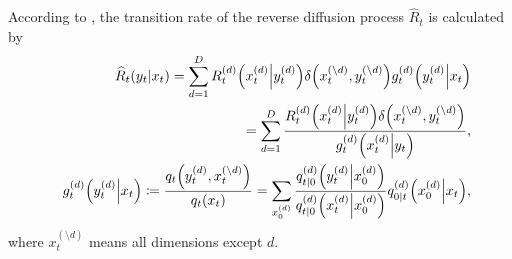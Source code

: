 \documentclass{article}
\begin{document}
According to \cite{zhao2024unified}, the transition rate of the reverse diffusion process $\widehat{R}_t$ is calculated by
\begin{eqnarray}\label{EqDivParaHatR}
    &&\widehat{R}_t\qty(y_t\middle|x_t)=\sum_{d=1}^D R^{(d)}_t\qty(x^{(d)}_t\middle| y^{(d)}_t)\delta\qty(x^{(\setminus d)}_t,y^{(\setminus d)}_t) g^{(d)}_t\qty(y^{(d)}_t\middle|x_t)\nonumber\\
    &&=\sum_{d=1}^D \frac{R^{(d)}_t\qty(x^{(d)}_t\middle| y^{(d)}_t)\delta\qty(x^{(\setminus d)}_t,y^{(\setminus d)}_t)}{g^{(d)}_t\qty(x^{(d)}_t\middle|y_t)},\\
    &&g^{(d)}_t\qty(y^{(d)}_t\middle|x_t)\coloneq \frac{q_t\qty(y^{(d)}_t, x^{(\setminus d)}_t)}{q_t\qty(x_t)} = \sum_{x^{(d)}_0}\frac{q^{(d)}_{t|0}\qty(y^{(d)}_t\middle|x^{(d)}_0)}{q^{(d)}_{t|0}\qty(x^{(d)}_t\middle|x^{(d)}_0)}q^{(d)}_{0|t}\qty(x^{(d)}_0\middle| x_t),
\end{eqnarray}
where $x^{(\setminus d)}_t$ means all dimensions except $d$.
\end{document}
